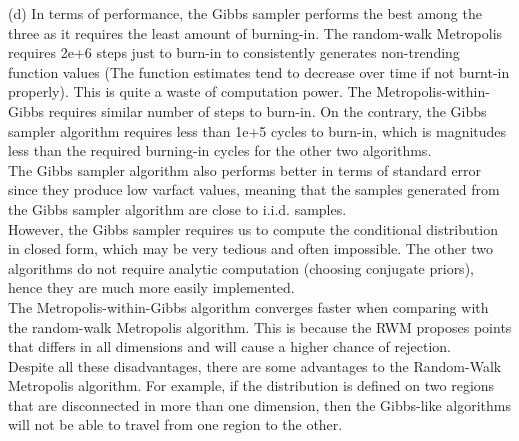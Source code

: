 (d) In terms of performance, the Gibbs sampler performs the best among the three as it requires the least amount of burning-in. The random-walk Metropolis requires 2e+6 steps just to burn-in to consistently generates non-trending function values (The function estimates tend to decrease over time if not burnt-in properly). This is quite a waste of computation power. The Metropolis-within-Gibbs requires similar number of steps to burn-in. On the contrary, the Gibbs sampler algorithm requires less than 1e+5 cycles to burn-in, which is magnitudes less than the required burning-in cycles for the other two algorithms. \\
The Gibbs sampler algorithm also performs better in terms of standard error since they produce low varfact values, meaning that the samples generated from the Gibbs sampler algorithm are close to i.i.d. samples. \\
However, the Gibbs sampler requires us to compute the conditional distribution in closed form, which may be very tedious and often impossible. The other two algorithms do not require analytic computation (choosing conjugate priors), hence they are much more easily implemented. \\
The Metropolis-within-Gibbs algorithm converges faster when comparing with the random-walk Metropolis algorithm. This is because the RWM proposes points that differs in all dimensions and will cause a higher chance of rejection.\\
Despite all these disadvantages, there are some advantages to the Random-Walk Metropolis algorithm. For example, if the distribution is defined on two regions that are disconnected in more than one dimension, then the Gibbs-like algorithms will not be able to travel from one region to the other. 
